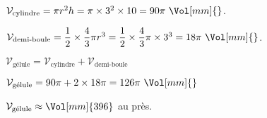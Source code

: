 \begin{corrige}
\begin{enumerate}
        {\color{red}%
        $\mathcal{V}_{\text{cylindre}}=\pi r^2 h=\pi\times3^2\times10=90\pi~\Vol[mm]{}$.
        
        $\mathcal{V}_{\text{demi-boule}}=\dfrac12\times\dfrac43\pi r^3=\dfrac12\times\dfrac43\pi\times3^3=18\pi~\Vol[mm]{}$.

        $\mathcal{V}_{\text{gélule}}=\mathcal{V}_{\text{cylindre}}+\mathcal{V}_{\text{demi-boule}}$

        $\mathcal{V}_{\text{gélule}}=90\pi+2\times 18\pi=126\pi~\Vol[mm]{}$

        $\mathcal{V}_{\text{gélule}}\approx \Vol[mm]{396}$ au \Vol[mm]{} près.
        }
    \end{enumerate}
\end{corrige}
